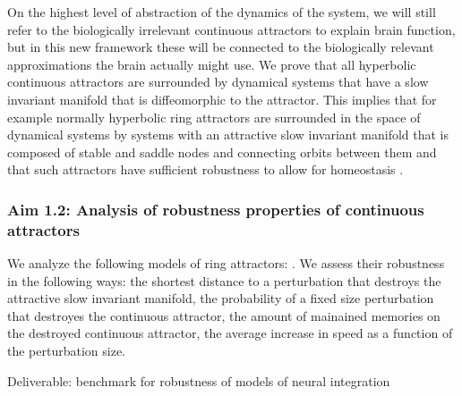\documentclass[12pt,letterpaper, onecolumn]{article}
\theoremstyle{definition}
\theoremstyle{remark}
\begin{document}
On the highest level of abstraction of the dynamics of the system, we will still refer to the biologically irrelevant continuous attractors to explain brain function, but in this new framework these will be connected to the biologically relevant approximations the brain actually might use.
We prove that all hyperbolic continuous attractors are surrounded by dynamical systems that have a slow invariant manifold that is diffeomorphic to the attractor. This implies that for example normally hyperbolic ring attractors are surrounded in the space of dynamical systems by systems with an attractive slow invariant manifold that is composed of stable and saddle nodes and connecting orbits between them  and that such attractors have sufficient robustness to allow for homeostasis \citep{oleary2018homeostasis, niemeyer2021, kozachkov2022a, seeholzer2019}.




%




\subsubsection*{Aim 1.2: Analysis of robustness properties of continuous attractors}
 We analyze the following models of ring attractors: \citep{pollock2020, barak2021mapping, beiran2021, noorman2022}.
We assess their robustness in the following ways:
the shortest distance to a perturbation that destroys the attractive slow invariant manifold,
the probability of a fixed size perturbation that destroyes the continuous attractor,
the amount of mainained memories on the destroyed continuous attractor,
the average increase in speed as a function of the perturbation size.





Deliverable: benchmark for robustness of models of neural integration
\end{document}

